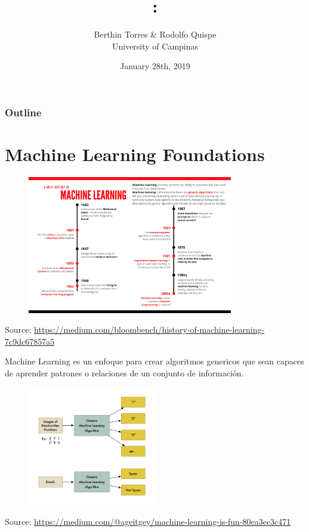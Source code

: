 \documentclass[english,svgnames,notes=hide,12pt]{beamer}
\title{\large\seminarname:\\\large\presentationtitle}
\author{Berthin Torres \& Rodolfo Quispe\\
    \small University of Campinas
}
\date{January 28th, 2019}
\begin{document}
\thispagestyle{empty}
\begin{frame}
    \titlepage
\end{frame}

\begin{frame}
    \frametitle{Outline}
    \tableofcontents
\end{frame}


\section{Machine Learning Foundations}
\begin{frame}
    \begin{figure}
        \includegraphics[width=0.8\textwidth]{imgs/machine-learning-timeline.pdf}
    \end{figure}
    \centering\tiny{Source: \url{https://medium.com/bloombench/history-of-machine-learning-7c9dc67857a5}}
\end{frame}

\begin{frame}
    Machine Learning es un enfoque para crear algoritmos genericos que sean capaces de aprender patrones o relaciones de un conjunto de informaci\'on.
    \vspace{-.5cm}
    \begin{figure}
        \includegraphics[width=0.5\textwidth]{imgs/sample-ml.png}
    \end{figure}
    \vspace{-.5cm}
    \centering\tiny{Source: \url{https://medium.com/@ageitgey/machine-learning-is-fun-80ea3ec3c471}}
\end{frame}
\end{document}
